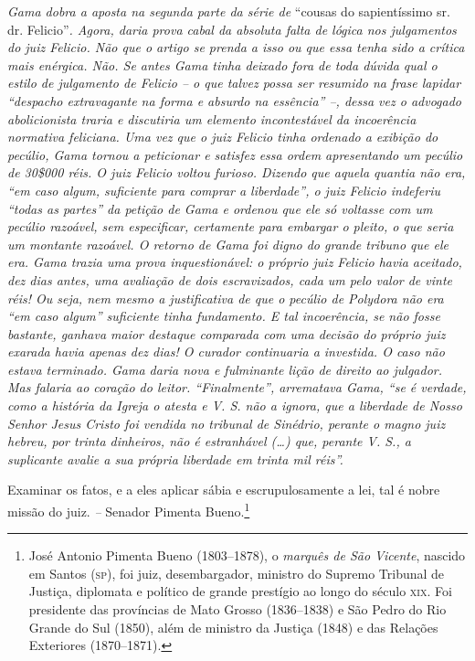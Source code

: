 \begin{didascalia}
\emph{Gama dobra a aposta na segunda parte da série de} ``cousas do
sapientíssimo sr. dr. Felicio''\emph{. Agora, daria prova cabal da
absoluta falta de lógica nos julgamentos do juiz Felicio. Não que o
artigo se prenda a isso ou que essa tenha sido a crítica mais enérgica.
Não. Se antes Gama tinha deixado fora de toda dúvida qual o estilo de
julgamento de Felicio -- o que talvez possa ser resumido na frase
lapidar ``despacho extravagante na forma e absurdo na essência'' --, dessa
vez o advogado abolicionista traria e discutiria um elemento
incontestável da incoerência normativa feliciana. Uma vez que o juiz
Felicio tinha ordenado a exibição do pecúlio, Gama tornou a peticionar e
satisfez essa ordem apresentando um pecúlio de 30\$000 réis. O juiz
Felicio voltou furioso. Dizendo que aquela quantia não era, ``em caso
algum, suficiente para comprar a liberdade'', o juiz Felicio indeferiu
``todas as partes'' da petição de Gama e ordenou que ele só voltasse com
um pecúlio razoável, sem especificar, certamente para embargar o pleito,
o que seria um montante razoável. O retorno de Gama foi digno do grande
tribuno que ele era. Gama trazia uma prova inquestionável: o próprio
juiz Felicio havia aceitado, dez dias antes, uma avaliação de dois
escravizados, cada um pelo valor de vinte réis! Ou seja, nem mesmo a
justificativa de que o pecúlio de Polydora não era ``em caso algum''
suficiente tinha fundamento. E tal incoerência, se não fosse bastante,
ganhava maior destaque comparada com uma decisão do próprio juiz exarada
havia apenas dez dias! O curador continuaria a investida. O caso não
estava terminado. Gama daria nova e fulminante lição de direito ao
julgador. Mas falaria ao coração do leitor. ``Finalmente'', arrematava
Gama, ``se é verdade, como a história da Igreja o atesta e V. S. não a
ignora, que a liberdade de Nosso Senhor Jesus Cristo foi vendida no
tribunal de Sinédrio, perante o magno juiz hebreu, por trinta dinheiros,
não é estranhável (\ldots{}) que, perante V. S., a suplicante avalie a sua
própria liberdade em trinta mil réis''.}
\end{didascalia}


Examinar os fatos, e a eles aplicar sábia e escrupulosamente a lei, tal
é nobre missão do juiz. \emph{--} Senador Pimenta Bueno.\footnote{ José
  Antonio Pimenta Bueno (1803--1878), o \emph{marquês de São Vicente},
  nascido em Santos (\textsc{sp}), foi juiz, desembargador, ministro do Supremo
  Tribunal de Justiça, diplomata e político de grande prestígio ao longo
  do século \textsc{xix}. Foi presidente das províncias de Mato Grosso
  (1836--1838) e São Pedro do Rio Grande do Sul (1850), além de ministro
  da Justiça (1848) e das Relações Exteriores (1870--1871).}

